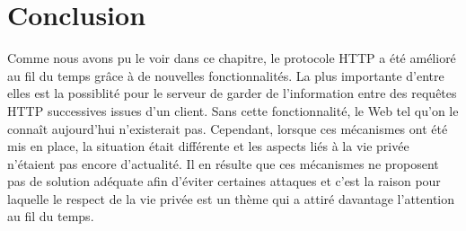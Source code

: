 \section{Conclusion}
Comme nous avons pu le voir dans ce chapitre, le protocole HTTP a été amélioré au fil du temps grâce à de nouvelles fonctionnalités. La plus importante d'entre elles est la possiblité pour le serveur de garder de l'information entre des requêtes HTTP successives issues d'un client. Sans cette fonctionnalité, le Web tel qu'on le connaît aujourd'hui n'existerait pas. Cependant, lorsque ces mécanismes ont été mis en place, la situation était différente et les aspects liés à la vie privée n'étaient pas encore d'actualité. Il en résulte que ces mécanismes ne proposent pas de solution adéquate afin d'éviter certaines attaques et c'est la raison pour laquelle le respect de la vie privée est un thème qui a attiré davantage l'attention au fil du temps.
